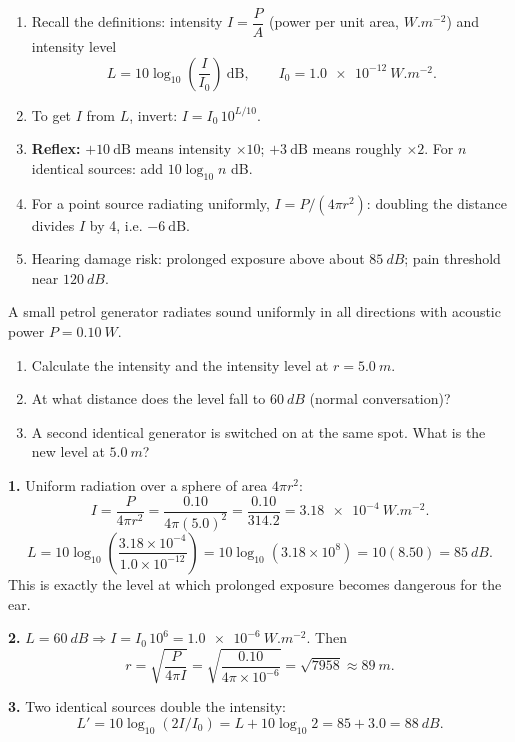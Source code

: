 \documentclass[11pt]{article}
\begin{document}
\begin{methode}
\begin{enumerate}
\item Recall the definitions: intensity $I=\dfrac{P}{A}$ (power per unit area, $\si{W.m^{-2}}$) and intensity level
\[
L=10\log_{10}\!\left(\frac{I}{I_0}\right)\ \text{dB},\qquad I_0=\SI{1.0e-12}{W.m^{-2}}.
\]
\item To get $I$ from $L$, invert: $I=I_0\,10^{L/10}$.
\item \textbf{Reflex:} $+10\ \mathrm{dB}$ means intensity $\times 10$; $+3\ \mathrm{dB}$ means roughly $\times 2$. For $n$ identical sources: add $10\log_{10}n$ dB.
\item For a point source radiating uniformly, $I=P/(4\pi r^2)$: doubling the distance divides $I$ by 4, i.e. $-6\ \mathrm{dB}$.
\item Hearing damage risk: prolonged exposure above about $\SI{85}{dB}$; pain threshold near $\SI{120}{dB}$.
\end{enumerate}
\end{methode}

\begin{exoresolu}
A small petrol generator radiates sound uniformly in all directions with acoustic power $P=\SI{0.10}{W}$.
\begin{enumerate}
\item Calculate the intensity and the intensity level at $r=\SI{5.0}{m}$.
\item At what distance does the level fall to $\SI{60}{dB}$ (normal conversation)?
\item A second identical generator is switched on at the same spot. What is the new level at $\SI{5.0}{m}$?
\end{enumerate}
\tcblower
\textbf{1.} Uniform radiation over a sphere of area $4\pi r^2$:
\[
I=\frac{P}{4\pi r^2}=\frac{0.10}{4\pi(5.0)^2}=\frac{0.10}{314.2}=\SI{3.18e-4}{W.m^{-2}}.
\]
\[
L=10\log_{10}\!\left(\frac{3.18\times10^{-4}}{1.0\times10^{-12}}\right)=10\log_{10}(3.18\times10^{8})=10(8.50)=\SI{85}{dB}.
\]
This is exactly the level at which prolonged exposure becomes dangerous for the ear.

\textbf{2.} $L=\SI{60}{dB}\Rightarrow I=I_0\,10^{6}=\SI{1.0e-6}{W.m^{-2}}$. Then
\[
r=\sqrt{\frac{P}{4\pi I}}=\sqrt{\frac{0.10}{4\pi\times10^{-6}}}=\sqrt{7958}\approx\SI{89}{m}.
\]

\textbf{3.} Two identical sources double the intensity:
\[
L'=10\log_{10}(2I/I_0)=L+10\log_{10}2=85+3.0=\SI{88}{dB}.
\]
\end{exoresolu}
\end{document}
